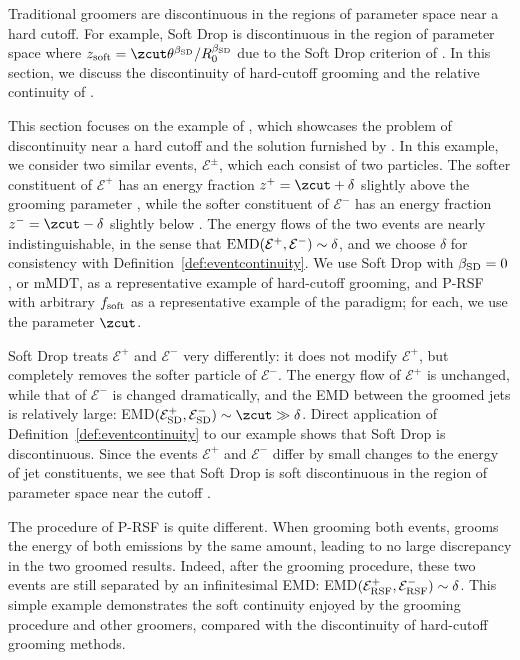Traditional groomers are discontinuous in the regions of parameter space near a hard cutoff.
%
For example, Soft Drop is discontinuous in the region of parameter space where
\(
    z_{\rm soft} = \zcut \theta^{\beta_{\rm SD}} / R_0^{\beta_{\rm SD}}
\)
due to the Soft Drop criterion of .
%
In this section, we discuss the discontinuity of hard-cutoff grooming and the relative continuity of \PIRANHA{}.

This section focuses on the example of , which showcases the problem of discontinuity near a hard cutoff and the solution furnished by \PIRANHA{}.
%
In this example, we consider two similar events, \(\mathcal{E}^\pm\), which each consist of two particles.
%
The softer constituent of \(\mathcal E^+\) has an energy fraction \(z^+ =  \zcut + \delta\) slightly above the grooming parameter \zcut, while the softer constituent of \(\mathcal E^-\) has an energy fraction \(z^- =\zcut - \delta\) slightly below \zcut.
%
The energy flows of the two events are nearly indistinguishable, in the sense that \(
{\rm EMD}(\mathcal{E}^+, \mathcal{E}^-)\sim\delta
\),
and we choose \(\delta\) for consistency with Definition~\ref{def:eventcontinuity}.
%
We use Soft Drop with \(\beta_{\rm SD} = 0\), or mMDT, as a representative example of hard-cutoff grooming, and P-RSF with arbitrary \(f_{\rm soft}\) as a representative example of the \PIRANHA{} paradigm;
%
for each, we use the parameter \(\zcut\).

Soft Drop treats \(\mathcal E^+\) and \(\mathcal E^-\) very differently:
%
it does not modify \(\mathcal E^+\), but completely removes the softer particle of \(\mathcal E^-\).
%
The energy flow of \(\mathcal E^+\) is unchanged, while that of \(\mathcal E^-\) is changed dramatically, and the EMD between the groomed jets is relatively large:
EMD\(
(\mathcal{E}^+_{\rm SD},
\mathcal{E}^-_{\rm SD})
\sim \zcut
\gg \delta\).
%
Direct application of Definition~\ref{def:eventcontinuity} to our example shows that Soft Drop is discontinuous.
%
Since the events \(\mathcal E^+\) and \(\mathcal E^-\) differ by small changes to the energy of jet constituents, we see that Soft Drop is soft discontinuous in the region of parameter space near the cutoff \zcut.

The procedure of P-RSF is quite different.
%
When grooming both events,  grooms the energy of both emissions by the same amount, leading to no large discrepancy in the two groomed results.
%
Indeed, after the  grooming procedure, these two events are still separated by an infinitesimal EMD:
EMD\((\mathcal{E}^+_{\rm RSF},
\mathcal{E}^-_{\rm RSF})\sim\delta\).
%
This simple example demonstrates the soft continuity enjoyed by the  grooming procedure and other \PIRANHA{} groomers, compared with the discontinuity of hard-cutoff grooming methods.

